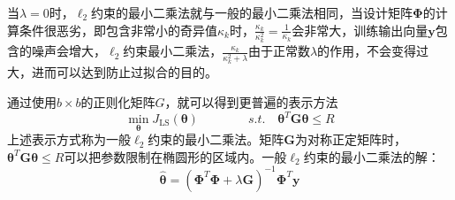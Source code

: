 \documentclass{beamer}
\newcommand{\tmmathbf}[1]{\ensuremath{\boldsymbol{#1}}}
\newcommand{\tmop}[1]{\ensuremath{\operatorname{#1}}}
\begin{document}
\begin{CJK*}{UTF8}{gbsn}
{{当$\lambda =
0$时，$\ell_2$约束的最小二乘法就与一般的最小二乘法相同，当设计矩阵$\tmmathbf{\Phi}$的计算条件很恶劣，即包含非常小的奇异值$\kappa_k$时，$\frac{\kappa_k}{\kappa_k^2}
=
\frac{1}{\kappa_k}$会非常大，训练输出向量$\tmmathbf{y}$包含的噪声会增大，$\ell_2$约束最小二乘法，$\frac{\kappa_k}{\kappa_k^2
+
\lambda}$由于正常数$\lambda$的作用，不会变得过大，进而可以达到防止过拟合的目的。

通过使用$b \times
b$的正则化矩阵$G$，就可以得到更普遍的表示方法
\[ \min_{\tmmathbf{\theta}} J_{\tmop{LS}} (\tmmathbf{\theta}) \hspace{4em}
   s.t. \quad \tmmathbf{\theta}^T \tmmathbf{G}\tmmathbf{\theta} \leqslant R \]
上述表示方式称为一般$\ell_2$约束的最小二乘法。矩阵$\tmmathbf{G}$为对称正定矩阵时，$\tmmathbf{\theta}^T
\tmmathbf{G}\tmmathbf{\theta} \leqslant
R$可以把参数限制在椭圆形的区域内。一般$\ell_2$约束的最小二乘法的解：
\[ \hat{\tmmathbf{\theta}} = (\tmmathbf{\Phi}^T \tmmathbf{\Phi}+ \lambda
   \tmmathbf{G})^{- 1} \tmmathbf{\Phi}^T \tmmathbf{y} \]}}

\end{CJK*}
\end{document}
